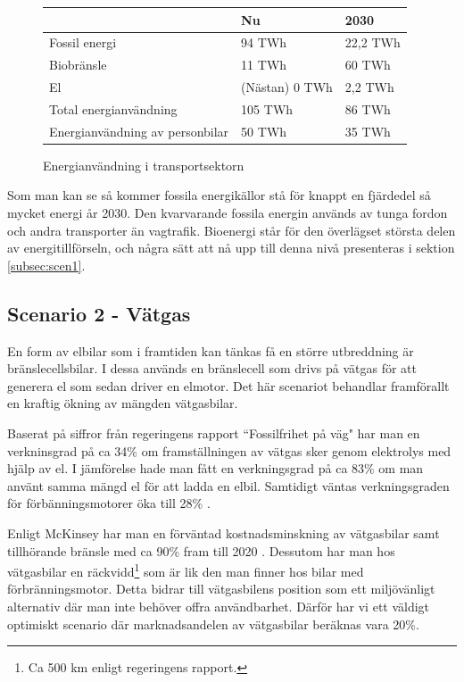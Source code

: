 \documentclass[a4paper,11pt,fleqn, titlepage]{article}
\begin{document}
\begin{figure}[h!]
	\begin{center}
	\begin{tabular}{ | l | l | l | }
	\hline
						& Nu		& 2030 \\ \hline
	Fossil energi				& 94 TWh	& 22,2 TWh \\ \hline
	Biobränsle				& 11 TWh	& 60 TWh \\ \hline %
	El					& (Nästan) 0 TWh &  2,2 TWh \\ \hline %
	Total energianvändning		& 105 TWh	& 86 TWh \\ \hline
	Energianvändning av personbilar	& 50 TWh	& 35 TWh \\ \hline
	\end{tabular}
	\caption{Energianvändning i transportsektorn}
	\label{tab:scen1energi}
\end{center}
\end{figure}

Som man kan se så kommer fossila energikällor stå för knappt en fjärdedel så mycket energi år 2030. Den kvarvarande fossila energin används av tunga fordon och andra transporter än vagtrafik. Bioenergi står för den överlägset största delen av energitillförseln, och några sätt att nå upp till denna nivå presenteras i sektion \ref{subsec:scen1}.

\subsection{Scenario 2 - Vätgas}
En form av elbilar som i framtiden kan tänkas få en större utbreddning är bränslecellsbilar.
I dessa används en bränslecell som drivs på vätgas för att generera el som sedan
driver en elmotor. Det här scenariot behandlar framförallt en kraftig ökning av mängden vätgasbilar.

Baserat på siffror från regeringens rapport ``Fossilfrihet på väg" har man en verkninsgrad på ca 34\%
om framställningen av vätgas sker genom elektrolys med hjälp av el. I jämförelse hade man fått en
verkningsgrad på ca 83\% om man använt samma mängd el för att ladda en elbil. Samtidigt väntas
verkningsgraden för förbänningsmotorer öka till 28\% \cite{fossilfrihet}.

Enligt McKinsey har man en förväntad kostnadsminskning av vätgasbilar samt tillhörande bränsle med
ca 90\% fram till 2020 \cite{mckinsey}. Dessutom har man hos vätgasbilar en räckvidd\footnote{Ca 500 km enligt regeringens rapport.} som är lik den man finner hos bilar
med förbränningsmotor. Detta bidrar till vätgasbilens position som ett miljövänligt alternativ där
man inte behöver offra användbarhet. Därför har vi ett väldigt optimiskt scenario där marknadsandelen av
vätgasbilar beräknas vara 20\%.
\end{document}
